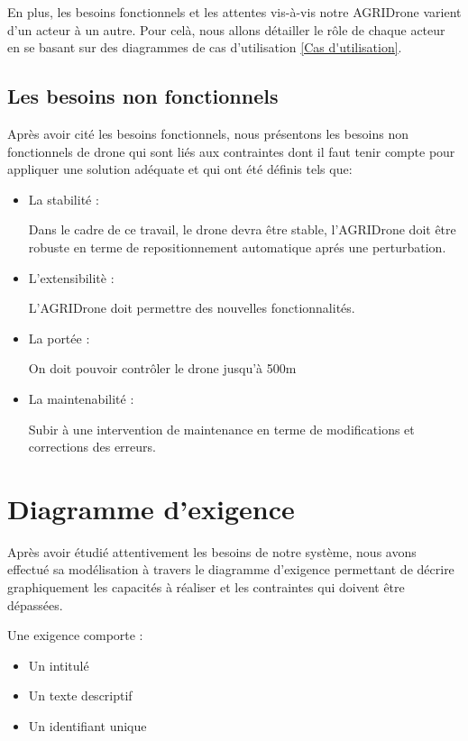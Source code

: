 	En plus, les besoins fonctionnels et les attentes vis-à-vis notre AGRIDrone varient d'un acteur à un autre. Pour celà, nous allons détailler le rôle de chaque acteur en se basant sur des diagrammes de cas d'utilisation \ref{Cas d'utilisation}.
	
	\subsection{Les besoins non fonctionnels}
	Après avoir cité les besoins fonctionnels, nous présentons
	les besoins non fonctionnels de drone qui sont liés aux contraintes dont il faut tenir compte pour appliquer une solution adéquate et qui ont été définis tels que:
	\begin{itemize}
		\item La stabilité :
		
		
		Dans le cadre de ce travail, le drone devra être stable, l'AGRIDrone doit être robuste en terme de repositionnement automatique aprés une perturbation.	
		
		\item L'extensibilitè : 
		
		
		L’AGRIDrone doit permettre des nouvelles fonctionnalités.
		
		\item La portée : 
		
		
		On doit pouvoir contrôler le drone jusqu'à 500m
		
		
		\item La maintenabilité : 
		
		Subir à une intervention de maintenance en terme de modifications et corrections des erreurs.
		\end {itemize}
		\section{Diagramme d’exigence }
		Après avoir étudié attentivement les besoins de  notre système, nous avons effectué sa modélisation à travers le diagramme d'exigence permettant de décrire graphiquement les capacités à réaliser et les contraintes qui doivent être dépassées.
		
    	Une exigence comporte : 
		\begin{itemize}
			\item Un intitulé 
			
			\item Un texte descriptif 
			
			\item Un identifiant unique
		\end{itemize}
		
